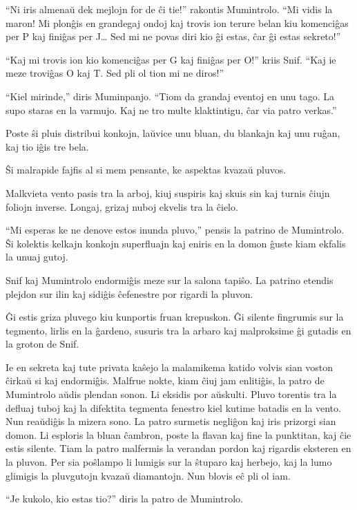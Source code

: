 ``Ni iris almenaŭ dek mejlojn for de ĉi tie!'' rakontis Mumintrolo. ``Mi vidis la maron! Mi plonĝis en grandegaj ondoj kaj trovis ion terure belan kiu komenciĝas per P kaj finiĝas per J{\ldots} Sed mi ne povas diri kio ĝi estas, ĉar ĝi estas sekreto!''

``Kaj mi trovis ion kio komenciĝas per G kaj finiĝas per O!'' kriis Snif. ``Kaj ie meze troviĝas O kaj T. Sed pli ol tion mi ne diros!''

``Kiel mirinde,'' diris Muminpanjo. ``Tiom da grandaj eventoj en unu tago. La supo staras en la varmujo. Kaj ne tro multe klaktintigu, ĉar via patro verkas.''

Poste ŝi pluis distribui konkojn, laŭvice unu bluan, du blankajn kaj unu ruĝan, kaj tio iĝis tre bela.

Ŝi malrapide fajfis al si mem pensante, ke aspektas kvazaŭ pluvos.

Malkvieta vento pasis tra la arboj, kiuj suspiris kaj skuis sin kaj turnis ĉiujn foliojn inverse. Longaj, grizaj nuboj ekvelis tra la ĉielo.

``Mi esperas ke ne denove estos inunda pluvo,'' pensis la patrino de Mumintrolo. Ŝi kolektis kelkajn konkojn superfluajn kaj eniris en la domon ĝuste kiam ekfalis la unuaj gutoj.

Snif kaj Mumintrolo endormiĝis meze sur la salona tapiŝo. La patrino etendis plejdon sur ilin kaj sidiĝis ĉefenestre por rigardi la pluvon.

Ĝi estis griza pluvego kiu kunportis fruan krepuskon. Ĝi silente fingrumis sur la tegmento, lirlis en la ĝardeno, susuris tra la arbaro kaj malproksime ĝi gutadis en la groton de Snif.

Ie en sekreta kaj tute privata kaŝejo la malamikema katido volvis sian voston ĉirkaŭ si kaj endormiĝis.
\sectionbreak
Malfrue nokte, kiam ĉiuj jam enlitiĝis, la patro de Mumintrolo aŭdis plendan sonon. Li eksidis por aŭskulti. Pluvo torentis tra la defluaj tuboj kaj la difektita tegmenta fenestro kiel kutime batadis en la vento. Nun reaŭdiĝis la mizera sono. La patro surmetis negliĝon kaj iris prizorgi sian domon. Li esploris la bluan ĉambron, poste la flavan kaj fine la punktitan, kaj ĉie estis silente. Tiam la patro malfermis la verandan pordon kaj rigardis eksteren en la pluvon. Per sia poŝlampo li lumigis sur la ŝtuparo kaj herbejo, kaj la lumo glimigis la pluvgutojn kvazaŭ diamantojn. Nun blovis eĉ pli ol iam.

``Je kukolo, kio estas tio?'' diris la patro de Mumintrolo.

